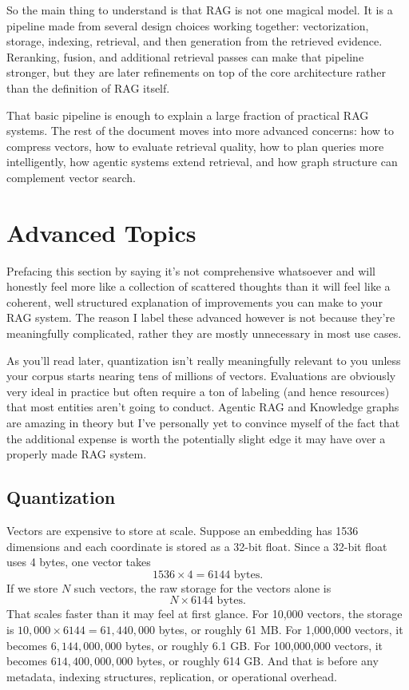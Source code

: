 \documentclass[12pt]{article}
\begin{document}
So the main thing to understand is that RAG is not one magical model. It
is a pipeline made from several design choices working together:
vectorization, storage, indexing, retrieval, and then generation from the
retrieved evidence. Reranking, fusion, and additional retrieval passes
can make that pipeline stronger, but they are later refinements on top of
the core architecture rather than the definition of RAG itself.

That basic pipeline is enough to explain a large fraction of practical
RAG systems. The rest of the document moves into more advanced concerns:
how to compress vectors, how to evaluate retrieval quality, how to plan
queries more intelligently, how agentic systems extend retrieval, and how
graph structure can complement vector search.

\section{Advanced Topics}

Prefacing this section by saying it's not comprehensive whatsoever and will honestly feel more like a collection of scattered thoughts than it will feel like a coherent, well structured explanation of improvements you can make to your RAG system. The reason I label these advanced however is not because they're meaningfully complicated, rather they are mostly unnecessary in most use cases.

As you'll read later, quantization isn't really meaningfully relevant to you unless your corpus starts nearing tens of millions of vectors. Evaluations are obviously very ideal in practice but often require a ton of labeling (and hence resources) that most entities aren't going to conduct. Agentic RAG and Knowledge graphs are amazing in theory but I've personally yet to convince myself of the fact that the additional expense is worth the potentially slight edge it may have over a properly made RAG system. 

\subsection{Quantization}

Vectors are expensive to store at scale. Suppose an embedding has 1536
dimensions and each coordinate is stored as a 32-bit float. Since a
32-bit float uses 4 bytes, one vector takes
\[
1536 \times 4 = 6144 \text{ bytes.}
\]
If we store $N$ such vectors, the raw storage for the vectors alone is
\[
N \times 6144 \text{ bytes.}
\]
That scales faster than it may feel at first glance. For 10,000 vectors,
the storage is $10{,}000 \times 6144 = 61{,}440{,}000$ bytes, or roughly
61 MB. For 1,000,000 vectors, it becomes $6{,}144{,}000{,}000$ bytes, or
roughly 6.1 GB. For 100,000,000 vectors, it becomes
$614{,}400{,}000{,}000$ bytes, or roughly 614 GB. And that is before any
metadata, indexing structures, replication, or operational overhead.
\end{document}
